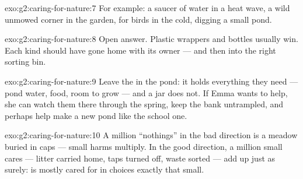 \begin{solution}{exo:g2:caring-for-nature:7}
For example: a saucer of water in a heat wave, a wild unmowed
corner in the garden,  for birds in the cold, digging a
small pond.
\end{solution}

\begin{solution}{exo:g2:caring-for-nature:8}
Open answer. Plastic wrappers and bottles usually win. Each kind
should have gone home with its owner --- and then into the right
sorting bin.
\end{solution}

\begin{solution}{exo:g2:caring-for-nature:9}
Leave the  in the pond: it holds everything they need ---
pond water, food, room to grow  --- and a jar does not. If
Emma wants to help, she can watch them there through the spring,
keep the bank untrampled, and perhaps help make a new pond
 like the school one.
\end{solution}

\begin{solution}{exo:g2:caring-for-nature:10}
A million ``nothings'' in the bad direction is a meadow buried in
caps --- small harms multiply. In the good direction, a million
small cares --- litter carried home, taps turned off, waste
sorted --- add up just as surely:  is mostly cared for in
choices exactly that small.
\end{solution}
